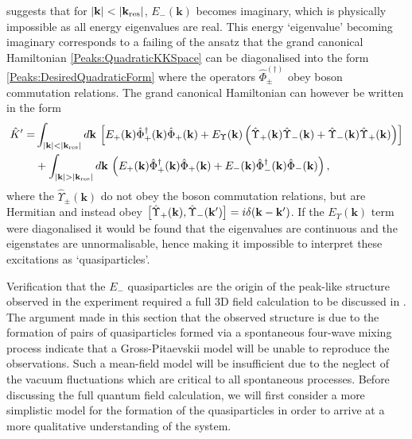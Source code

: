  suggests that for $\left|\mathbf{k}\right| < \left|\mathbf{k}_\text{res}\right|$, $E_-(\mathbf{k})$ becomes imaginary, which is physically impossible as all energy eigenvalues are real. This energy `eigenvalue' becoming imaginary corresponds to a failing of the ansatz that the grand canonical Hamiltonian \eqref{Peaks:QuadraticKKSpace} can be diagonalised into the form \eqref{Peaks:DesiredQuadraticForm} where the operators $\hat{\Phi}_\pm^{(\dagger)}$ obey boson commutation relations. The grand canonical Hamiltonian can however be written in the form
\begin{align}
    \begin{split}
        \hat{K}' =& \int_{\abs{\mathbf{k}}<\abs{\mathbf{k}_\text{res}}} d\mathbf{k}\, \left[ E_+(\mathbf{k}) \hat{\Phi}_+^\dagger(\mathbf{k})\hat{\Phi}_+(\mathbf{k}) + E_\Upsilon(\mathbf{k}) \left( \hat{\Upsilon}_+(\mathbf{k}) \hat{\Upsilon}_-(\mathbf{k}) + \hat{\Upsilon}_-(\mathbf{k}) \hat{\Upsilon}_+(\mathbf{k})\right)\right] \\
        & + \int_{\abs{\mathbf{k}}>\abs{\mathbf{k}_\text{res}}} d\mathbf{k}\, \left( E_+(\mathbf{k}) \hat{\Phi}_+^\dagger(\mathbf{k})\hat{\Phi}_+(\mathbf{k}) + E_-(\mathbf{k}) \hat{\Phi}_-^\dagger(\mathbf{k}) \hat{\Phi}_-(\mathbf{k})\right),
    \end{split}
\end{align}
where the $\hat{\Upsilon}_\pm(\mathbf{k})$ do not obey the boson commutation relations, but are Hermitian and instead obey $\big[\hat{\Upsilon}_+(\mathbf{k}), \hat{\Upsilon}_-(\mathbf{k}')\big] = i \delta(\mathbf{k}-\mathbf{k}')$. If the $E_\Upsilon(\mathbf{k})$ term were diagonalised it would be found that the eigenvalues are continuous and the eigenstates are unnormalisable, hence making it impossible to interpret these excitations as `quasiparticles'.

Verification that the $E_-$ quasiparticles are the origin of the peak-like structure observed in the experiment required a full 3D field calculation to be discussed in .  The argument made in this section that the observed structure is due to the formation of pairs of quasiparticles formed via a spontaneous four-wave mixing process indicate that a Gross-Pitaevskii model will be unable to reproduce the observations. Such a mean-field model will be insufficient due to the neglect of the vacuum fluctuations which are critical to all spontaneous processes. Before discussing the full quantum field calculation, we will first consider a more simplistic model for the formation of the quasiparticles in order to arrive at a more qualitative understanding of the system.

